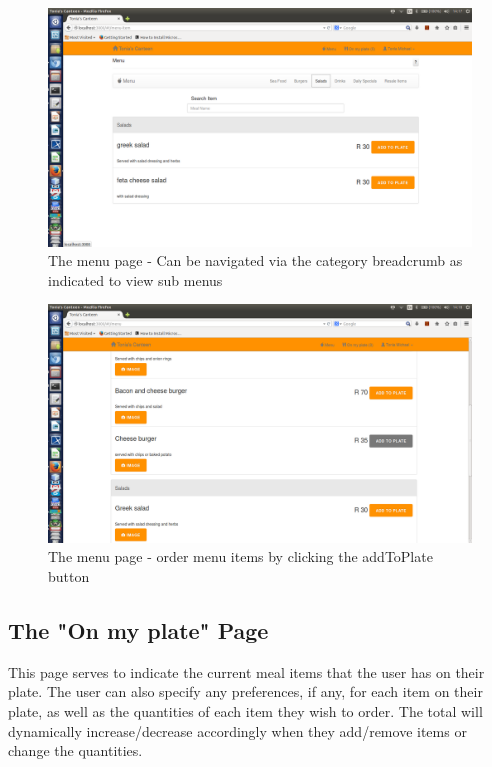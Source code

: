 \documentclass[a4paper,12pt]{report}
\begin{document}
\begin{figure}[H]
  \centering
    \includegraphics[width=1.0\textwidth]{screenshots/catMenu.png}
    \caption{The menu page - Can be navigated via the category breadcrumb as indicated to view sub menus} 
\end{figure}

\begin{figure}[H]
  \centering
    \includegraphics[width=1.0\textwidth]{screenshots/addToPlate.png}
    \caption{The menu page - order menu items by clicking the addToPlate button } 
\end{figure}

\subsection{The "On my plate" Page} 
This page serves to indicate the current meal items that the user has on their plate. The user can also specify any preferences, if any, for each item on their plate, as well as the quantities of each item they wish to order. The total will dynamically increase/decrease accordingly when they add/remove items or change the quantities.
\end{document}
